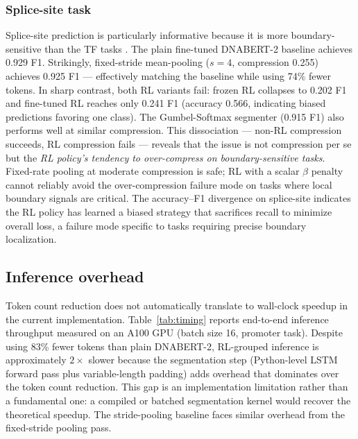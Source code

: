 \documentclass[sigconf,screen]{acmart}
\newcommand{\dnabert}{DNABERT-2\xspace}
\begin{document}
\subsubsection{Splice-site task}
Splice-site prediction is particularly informative because it is more boundary-sensitive than the TF tasks \cite{jaganathan2019predicting}. The plain fine-tuned \dnabert baseline achieves 0.929 F1. Strikingly, fixed-stride mean-pooling ($s=4$, compression 0.255) achieves 0.925 F1 — effectively matching the baseline while using 74\% fewer tokens. In sharp contrast, both RL variants fail: frozen RL collapses to 0.202 F1 and fine-tuned RL reaches only 0.241 F1 (accuracy 0.566, indicating biased predictions favoring one class). The Gumbel-Softmax segmenter (0.915 F1) also performs well at similar compression. This dissociation — non-RL compression succeeds, RL compression fails — reveals that the issue is not compression per se but the \emph{RL policy's tendency to over-compress on boundary-sensitive tasks}. Fixed-rate pooling at moderate compression is safe; RL with a scalar $\beta$ penalty cannot reliably avoid the over-compression failure mode on tasks where local boundary signals are critical. The accuracy–F1 divergence on splice-site indicates the RL policy has learned a biased strategy that sacrifices recall to minimize overall loss, a failure mode specific to tasks requiring precise boundary localization.

\subsection{Inference overhead}
Token count reduction does not automatically translate to wall-clock speedup in the current implementation. Table~\ref{tab:timing} reports end-to-end inference throughput measured on an A100 GPU (batch size 16, promoter task). Despite using 83\% fewer tokens than plain \dnabert, RL-grouped inference is approximately $2\times$ slower because the segmentation step (Python-level LSTM forward pass plus variable-length padding) adds overhead that dominates over the token count reduction. This gap is an implementation limitation rather than a fundamental one: a compiled or batched segmentation kernel would recover the theoretical speedup. The stride-pooling baseline faces similar overhead from the fixed-stride pooling pass.
\end{document}
